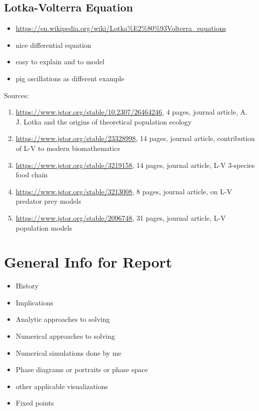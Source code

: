 \subsection{Lotka-Volterra Equation}
\begin{itemize}
    \item \url{https://en.wikipedia.org/wiki/Lotka%E2%80%93Volterra_equations}
    \item nice differential equation
    \item easy to explain and to model
    \item pig oscillations as different example
\end{itemize}
Sources:
\begin{enumerate}
    \item \url{https://www.jstor.org/stable/10.2307/26464246}, 4 pages, journal 
        article, A. J. Lotka and the origins of theoretical population ecology
    \item \url{https://www.jstor.org/stable/23328998}, 14 pages, journal
        article, contribution of L-V to modern biomathematics
    \item \url{https://www.jstor.org/stable/3219158}, 14 pages, journal
        article, L-V 3-species food chain
    \item \url{https://www.jstor.org/stable/3213008}, 8 pages, journal article,
        on L-V predator prey models
    \item \url{https://www.jstor.org/stable/2096748}, 31 pages, journal
        article, L-V population models
\end{enumerate}

\section{General Info for Report}

\begin{itemize}
    \item History
    \item Implications
    \item Analytic approaches to solving
    \item Numerical approaches to solving
    \item Numerical simulations done by me
    \item Phase diagrams or portraits or phase space
    \item other applicable visualizations
    \item Fixed points
\end{itemize}

